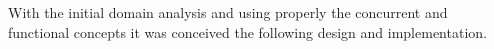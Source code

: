 
With the initial domain analysis and using properly the concurrent and functional concepts it was conceived the following design and implementation. 